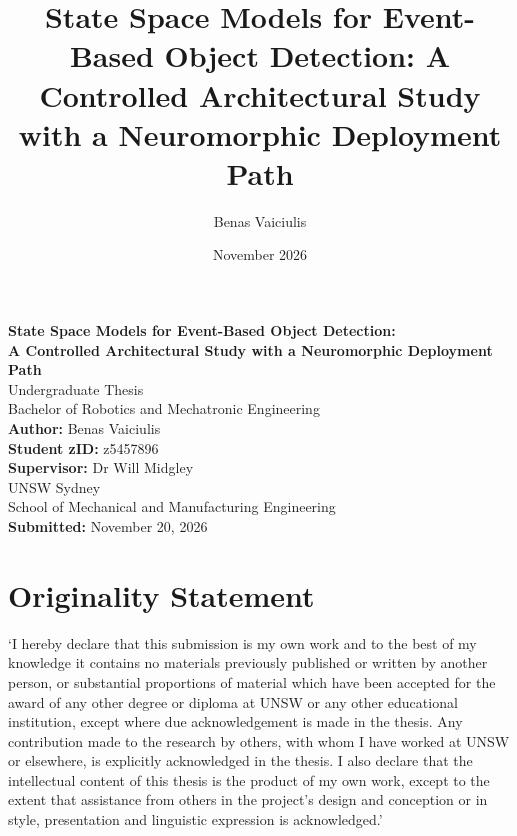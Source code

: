 \documentclass[11pt, a4paper]{report}
\title{State Space Models for Event-Based Object Detection: A Controlled Architectural Study with a Neuromorphic Deployment Path}
\author{Benas Vaiciulis}
\date{November 2026}
\begin{document}

\begin{titlepage}
    \centering
    \vspace*{1cm}
    \Large\textbf{State Space Models for Event-Based Object Detection:}\\[4pt]
    \Large\textbf{A Controlled Architectural Study with a Neuromorphic Deployment Path} \\
    \vspace{0.5cm}
    \large Undergraduate Thesis\\
    Bachelor of Robotics and Mechatronic Engineering \\
    \vspace{1.5cm}
    \textbf{Author:} Benas Vaiciulis \\
    \textbf{Student zID:} z5457896 \\
    \textbf{Supervisor:} Dr Will Midgley \\
    \vspace{1.5cm}
    UNSW Sydney \\
    School of Mechanical and Manufacturing Engineering \\
    \vfill
    \textbf{Submitted:} November 20, 2026
\end{titlepage}

\chapter*{Originality Statement}
`I hereby declare that this submission is my own work and to the best of my knowledge it contains no materials previously published or written by another person, or substantial proportions of material which have been accepted for the award of any other degree or diploma at UNSW or any other educational institution, except where due acknowledgement is made in the thesis. Any contribution made to the research by others, with whom I have worked at UNSW or elsewhere, is explicitly acknowledged in the thesis. I also declare that the intellectual content of this thesis is the product of my own work, except to the extent that assistance from others in the project's design and conception or in style, presentation and linguistic expression is acknowledged.'
\end{document}
